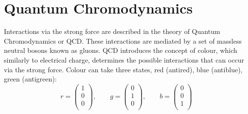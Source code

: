 \section{Quantum Chromodynamics}

Interactions via the strong force are described in the theory of Quantum Chromodynamics or QCD. These interactions are mediated by a set of massless neutral bosons known as gluons. QCD introduces the concept of colour, which similarly to electrical charge, determines the possible interactions that can occur via the strong force. Colour can take three states, red (antired), blue (antiblue), green (antigreen):
\begin{equation}
r=\begin{pmatrix}
  1 \\
  0 \\
  0 \\
\end{pmatrix},
\qquad
g=\begin{pmatrix}
  0 \\
  1 \\
  0 \\
\end{pmatrix},
\qquad
b=\begin{pmatrix}
  0 \\
  0 \\
  1 \\
\end{pmatrix}
\end{equation}

